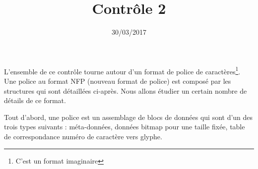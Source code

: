 \documentclass[a4paper]{iutvexam}
\title{Contrôle 2}
\date{30/03/2017}
\begin{document}


L'ensemble de ce contrôle tourne autour d'un format de police de caractères\footnote{C'est un format imaginaire}. Une police au format NFP (nouveau format de police) est composé par les structures qui sont détaillées ci-après. Nous allons étudier un certain nombre de détails de ce format.

Tout d'abord, une police est un assemblage de blocs de données qui
sont d'un des trois types suivants : méta-données, données bitmap pour
une taille fixée, table de correspondance numéro de caractère vers
glyphe.
\end{document}
